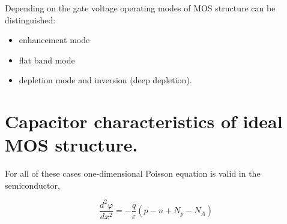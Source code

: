 \iffalse
\noindent V závislosti od hradlového napätia možno rozlíšiť tieto
pracovné režimy štruktúry MOS:
\fi
\noindent Depending on the gate voltage operating modes of MOS
structure can be distinguished:

\iffalse
\begin{itemize}
\item režim obohatenia
\item stav vyrovnaných pásov
\item režim ochudobnenia a inverzie (hlbokého ochudobnenia).
\end{itemize}
\fi
\begin{itemize}
\item enhancement mode
\item flat band mode
\item depletion mode and inversion (deep depletion).
\end{itemize}

\iffalse
\section{Kapacitné závislosti ideálnej štruktúry MOS.}
Pre všetky uvedené prípady platí v polovodiči jednodimenzionálna
Poissonova rovnica
\fi
\section{Capacitor characteristics of ideal MOS structure.}
 For all of these cases one-dimensional
Poisson equation is valid in the semiconductor,

\begin{equation}\label{eq:1.2}
\frac{d^2\varphi}{dx^2}=-\frac{q}{\varepsilon}(p-n+N_{p}-N_{A})
\end{equation}


